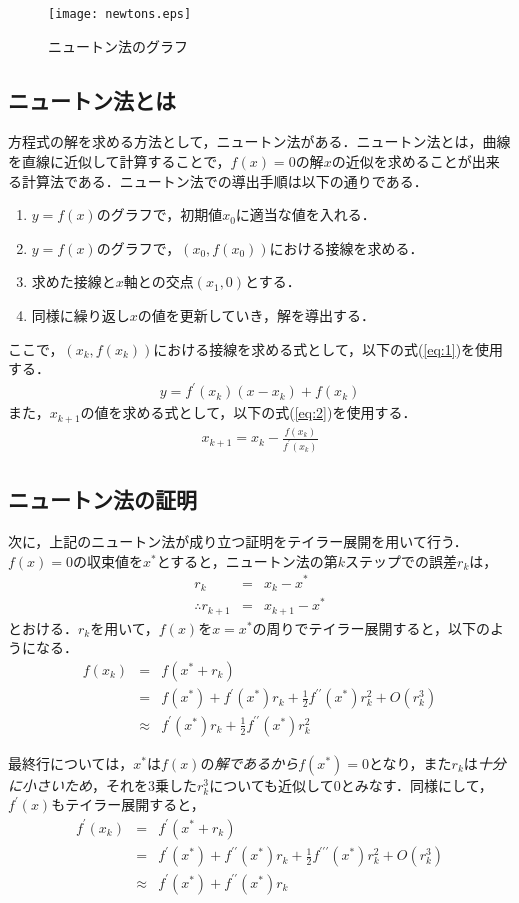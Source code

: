 \documentclass[12pt]{jarticle}
\renewcommand  \[  {\begin{eqnarray}}
\renewcommand  \]  {\end{eqnarray}}
\begin{document}
\begin{figure}[t]
\texttt{[image: newtons.eps]}
\caption{ニュートン法のグラフ}
\label{fig:newtons}
\end{figure}

\subsection{ニュートン法とは}

方程式の解を求める方法として，ニュートン法がある．ニュートン法とは，曲線を直線に近似して計算することで，$f(x)=0$の解$x$の近似を求めることが出来る計算法である．ニュートン法での導出手順は以下の通りである．

\begin{enumerate}
\item $y=f(x)$のグラフで，初期値$x_0$に適当な値を入れる．
\item $y=f(x)$のグラフで，$(x_0,f(x_0))$における接線を求める．
\item 求めた接線と$x$軸との交点$(x_1,0)$とする．
\item 同様に繰り返し$x$の値を更新していき，解を導出する．
\end{enumerate}

ここで，$(x_k,f(x_k))$における接線を求める式として，以下の式(\ref{eq:1})を使用する．
\[
y=f^{\prime}(x_k)(x-x_k)+f(x_k)
\label{eq:1}
\]
また，$x_{k+1}$の値を求める式として，以下の式(\ref{eq:2})を使用する．
\[
x_{k+1}=x_k-\frac{f(x_k)}{f^{\prime}(x_k)}
\label{eq:2}
\]

\subsection{ニュートン法の証明}

次に，上記のニュートン法が成り立つ証明をテイラー展開を用いて行う．
$f(x)=0$の収束値を$x^{\ast}$とすると，ニュートン法の第$k$ステップでの誤差$r_k$は，
\[
r_k&=&x_k-x^{\ast}
\label{eq:3}
\\
\therefore
r_{k+1}&=&x_{k+1}-x^{\ast}
\label{eq:4}
\]
とおける．$r_k$を用いて，$f(x)$を$x=x^{\ast}$の周りでテイラー展開すると，以下のようになる．
\[
f(x_k)&=&f(x^{\ast}+r_k) \nonumber \\
&=&f(x^{\ast})+f^{\prime}(x^{\ast})r_k+\frac{1}{2}f^{\prime\prime}(x^{\ast})r_k^2+O(r_k^3) \nonumber \\
&\approx&f^{\prime}(x^{\ast})r_k+\frac{1}{2}f^{\prime\prime}(x^{\ast})r_k^2
\label{eq:5}
\]

最終行については，$x^{\ast}$は$f(x)$の\emph{解であるから}$f(x^{\ast})=0$となり，また$r_k$は\emph{十分に小さいため}，それを3乗した$r_k^3$についても近似して0とみなす．同様にして，$f^{\prime}(x)$もテイラー展開すると，
\[
f^{\prime}(x_k)&=&f^{\prime}(x^{\ast}+r_k) \nonumber \\
&=&f^{\prime}(x^{\ast})+f^{\prime\prime}(x^{\ast})r_k+\frac{1}{2}f^{\prime\prime\prime}(x^{\ast})r_k^2+O(r_k^3) \nonumber \\
&\approx&f^{\prime}(x^{\ast})+f^{\prime\prime}(x^{\ast})r_k
\label{eq:6}
\]
\end{document}
